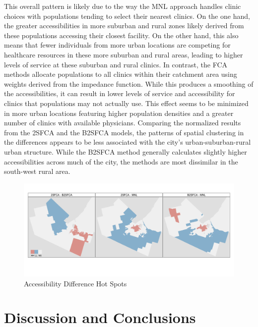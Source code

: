 \documentclass{article}
\begin{document}
This overall pattern is likely due to the way the MNL approach handles
clinic choices with populations tending to select their nearest clinics.
On the one hand, the greater accessibilities in more suburban and rural
zones likely derived from these populations accessing their closest
facility. On the other hand, this also means that fewer individuals from
more urban locations are competing for healthcare resources in these
more suburban and rural areas, leading to higher levels of service at
these suburban and rural clinics. In contrast, the FCA methods allocate
populations to all clinics within their catchment area using weights
derived from the impedance function. While this produces a smoothing of
the accessibilities, it can result in lower levels of service and
accessibility for clinics that populations may not actually use. This
effect seems to be minimized in more urban locations featuring higher
population densities and a greater number of clinics with available
physicians. Comparing the normalized results from the 2SFCA and the
B2SFCA models, the patterns of spatial clustering in the differences
appears to be less associated with the city's urban-suburban-rural urban
structure. While the B2SFCA method generally calculates slightly higher
accessibilities across much of the city, the methods are most dissimilar
in the south-west rural area.

\begin{figure}
\includegraphics[width=1\linewidth]{./img/access_locm_maps} \caption{\label{fig:access_locm_maps}Accessibility Difference Hot Spots}\label{fig:fig 4}
\end{figure}

\hypertarget{discussion-and-conclusions}{%
\section{Discussion and Conclusions}\label{discussion-and-conclusions}}
\end{document}
